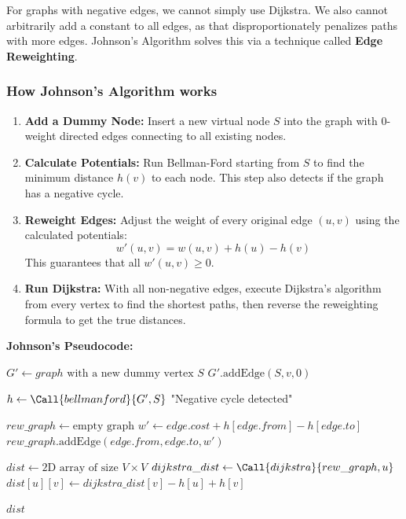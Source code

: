 \vspace{0.2cm}
For graphs with negative edges, we cannot simply use Dijkstra. We also cannot arbitrarily add a constant to all edges, as that disproportionately penalizes paths with more edges. Johnson's Algorithm solves this via a technique called \textbf{Edge Reweighting}.

\subsubsection{How Johnson's Algorithm works}
\begin{enumerate}
    \item \textbf{Add a Dummy Node:} Insert a new virtual node $S$ into the graph with $0$-weight directed edges connecting to all existing nodes.
    \item \textbf{Calculate Potentials:} Run Bellman-Ford starting from $S$ to find the minimum distance $h(v)$ to each node. This step also detects if the graph has a negative cycle.
    \item \textbf{Reweight Edges:} Adjust the weight of every original edge $(u, v)$ using the calculated potentials: 
    \[ w'(u, v) = w(u, v) + h(u) - h(v) \]
    This guarantees that all $w'(u, v) \ge 0$.
    \item \textbf{Run Dijkstra:} With all non-negative edges, execute Dijkstra's algorithm from every vertex to find the shortest paths, then reverse the reweighting formula to get the true distances.
\end{enumerate}

\textbf{Johnson's Pseudocode:}
\begin{algorithm}[H]
\caption{Johnson's Algorithm}
\begin{algorithmic}[1]
    \State $G' \gets graph \text{ with a new dummy vertex } S$
        \State $G'.\text{addEdge}(S, v, 0)$
    \EndFor
    
    \State $h \gets \Call{bellmanford}{G', S}$ 
        \State \Return "Negative cycle detected"
    \EndIf
    
    \State $rew\_graph \gets \text{empty graph}$
        \State $w' \gets edge.cost + h[edge.from] - h[edge.to]$
        \State $rew\_graph.\text{addEdge}(edge.from, edge.to, w')$
    \EndFor
    
    \State $dist \gets \text{2D array of size } V \times V$
        \State $dijkstra\_dist \gets \Call{dijkstra}{rew\_graph, u}$
            \State $dist[u][v] \gets dijkstra\_dist[v] - h[u] + h[v]$ 
        \EndFor
    \EndFor
    
    \State \Return $dist$
\EndFunction
\end{algorithmic}
\end{algorithm}

